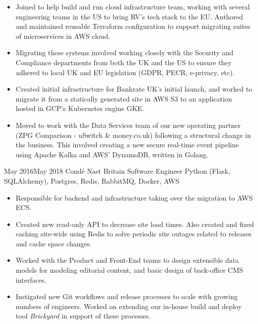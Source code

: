 \documentclass[10pt]{article} %
\begin{document}
{
      \begin{itemize}

      \item Joined to help build and run cloud infrastructure team, working
            with several engineering teams in the US to bring RV's tech stack to the EU.
            Authored and maintained reusable Terraform configuration to support migrating
            suites of microservices in AWS cloud.

      \item Migrating these systems involved working closely with the Security
            and Compliance departments from both the UK and the US to ensure they
            adhered to local UK and EU legislation (GDPR, PECR, e-privacy, etc).

      \item Created initial infrastructure for Bankrate UK's initial launch, and worked
            to migrate it from a statically generated site in AWS S3 to an application hosted
            in GCP's Kubernetes engine GKE.

      \item Moved to work with the Data Services team of our new operating partner
            (ZPG Comparison - uSwitch \& money.co.uk) following a structural change
            in the business. This involved creating a new secure real-time event
            pipeline using Apache Kafka and AWS' DynamoDB, written in Golang.

  \end{itemize}

}
\jobheader
{May 2016}{May 2018}
{Condé Nast Britain}
{Software Engineer}
{
      Python (Flask, SQLAlchemy),
      Postgres,
      Redis,
      RabbitMQ,
      Docker,
      AWS    
}
{
  \begin{itemize}

      \item Responsible for backend and infrastructure taking over the migration to AWS ECS.

      \item Created new read-only API to decrease site load times. Also created and fixed
            caching site-wide using Redis to solve periodic site outages related to
            releases and cache space changes.

      \item Worked with the Product and Front-End teams to design extensible data models
            for modeling editorial content, and basic design of back-office CMS
            interfaces.

      \item Instigated new Git workflows and release processes to scale with growing
            numbers of engineers. Worked on extending our in-house build and deploy
            tool \textit{Brickyard} in support of these processes.

  \end{itemize}

}
\end{document}
